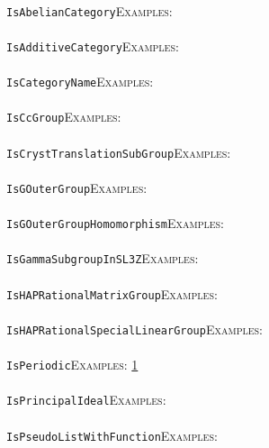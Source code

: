 \documentclass[a4paper,11pt]{report}
\begin{document}
{{ \\
 \texttt{IsAbelianCategory}{\nobreakspace}{\nobreakspace}{\nobreakspace}{\nobreakspace}\textsc{Examples:} \\
 \\
 \texttt{IsAdditiveCategory}{\nobreakspace}{\nobreakspace}{\nobreakspace}{\nobreakspace}\textsc{Examples:} \\
 \\
 \texttt{IsCategoryName}{\nobreakspace}{\nobreakspace}{\nobreakspace}{\nobreakspace}\textsc{Examples:} \\
 \\
 \texttt{IsCcGroup}{\nobreakspace}{\nobreakspace}{\nobreakspace}{\nobreakspace}\textsc{Examples:} \\
 \\
 \texttt{IsCrystTranslationSubGroup}{\nobreakspace}{\nobreakspace}{\nobreakspace}{\nobreakspace}\textsc{Examples:} \\
 \\
 \texttt{IsGOuterGroup}{\nobreakspace}{\nobreakspace}{\nobreakspace}{\nobreakspace}\textsc{Examples:} \\
 \\
 \texttt{IsGOuterGroupHomomorphism}{\nobreakspace}{\nobreakspace}{\nobreakspace}{\nobreakspace}\textsc{Examples:} \\
 \\
 \texttt{IsGammaSubgroupInSL3Z}{\nobreakspace}{\nobreakspace}{\nobreakspace}{\nobreakspace}\textsc{Examples:} \\
 \\
 \texttt{IsHAPRationalMatrixGroup}{\nobreakspace}{\nobreakspace}{\nobreakspace}{\nobreakspace}\textsc{Examples:} \\
 \\
 \texttt{IsHAPRationalSpecialLinearGroup}{\nobreakspace}{\nobreakspace}{\nobreakspace}{\nobreakspace}\textsc{Examples:} \\
 \\
 \texttt{IsPeriodic}{\nobreakspace}{\nobreakspace}{\nobreakspace}{\nobreakspace}\textsc{Examples:} \href{tutorial/chap10.html} {1}{\nobreakspace} \\
 \\
 \texttt{IsPrincipalIdeal}{\nobreakspace}{\nobreakspace}{\nobreakspace}{\nobreakspace}\textsc{Examples:} \\
 \\
 \texttt{IsPseudoListWithFunction}{\nobreakspace}{\nobreakspace}{\nobreakspace}{\nobreakspace}\textsc{Examples:} \\
 \\
}}
\end{document}
